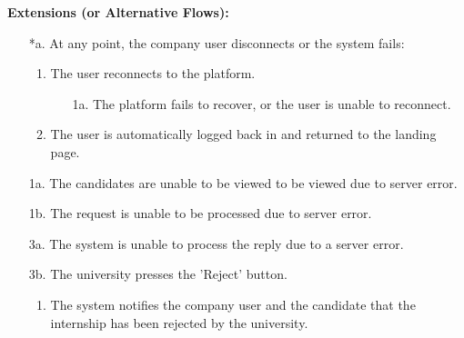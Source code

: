 \begin{itemize}[label={[\textbf{UC}]}, align=left, leftmargin=*]
    \textbf{Extensions (or Alternative Flows):} 
    \begin{enumerate}[label=\arabic*.]
        \item[*a.] At any point, the company user disconnects or the system fails:
            \begin{enumerate}[label=\arabic*.]
                \item The user reconnects to the platform.
                    \begin{enumerate}[label=\alph*.]
                        \item[1a.] The platform fails to recover, or the user is unable to reconnect.
                    \end{enumerate}
                 \item The user is automatically logged back in and returned to the landing page.
            \end{enumerate}
        \item[1a.] The candidates are unable to be viewed to be viewed due to server error.
        \item[1b.] The request is unable to be processed due to server error.
        \item[3a.] The system is unable to process the reply due to a server error. 
        \item[3b.] The university presses the 'Reject' button.
        \begin{enumerate}[label=\arabic*.]
                \item The system notifies the company user and the candidate that the internship has been rejected by the university.
            \end{enumerate}
        
        \end{enumerate}



\end{itemize}
